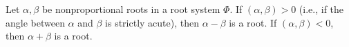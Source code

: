 Let $\alpha, \beta$ be nonproportional roots in a root system $\Phi$. If $(\alpha, \beta) > 0$ (i.e., if the angle between $\alpha$ and $\beta$ is strictly acute), then $\alpha - \beta$ is a root. If $(\alpha, \beta) < 0$, then $\alpha + \beta$ is a root.
